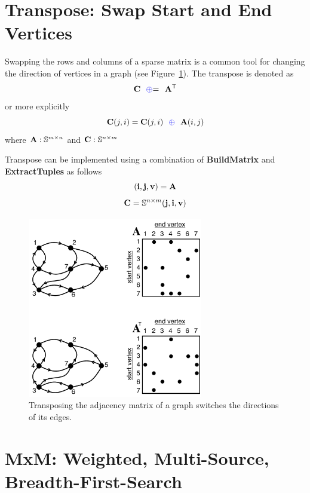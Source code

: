 \section{Transpose: Swap Start and End Vertices}
  Swapping the rows and columns of a sparse matrix is a common tool for changing the direction of vertices in a graph (see Figure~\ref{fig:AdjacencyMatrixTranspose}).  The transpose is denoted as
$$
     {\bf C} ~~ {\textcolor{blue}{\oplus}}{=} ~~ {\bf A}^{\sf T}
$$   
or more explicitly
$$
     {\bf C}(j,i) = {\bf C}(j,i) ~~ {\textcolor{blue}{\oplus}} ~~ {\bf A}(i,j)
$$   
where ${\bf A}:\mathbb{S}^{m \times n}$ and ${\bf C}:\mathbb{S}^{n \times m}$

Transpose can be implemented using a combination of {\bf BuildMatrix} and {\bf ExtractTuples} as follows
$$
	({\bf i},{\bf j},{\bf v}) = {\bf A}
$$
$$
   \mathbf{C} = \mathbb{S}^{n \times m}({\bf j},{\bf i},{\bf v})
$$

\begin{figure}[!htb]
  \centering
    \includegraphics[width=3in]{figures/AdjacencyMatrixTranspose.pdf}
      \caption{Transposing the adjacency matrix of a graph switches the directions of its edges.}
      \label{fig:AdjacencyMatrixTranspose}
\end{figure}
  
\section{MxM: Weighted, Multi-Source, Breadth-First-Search}

